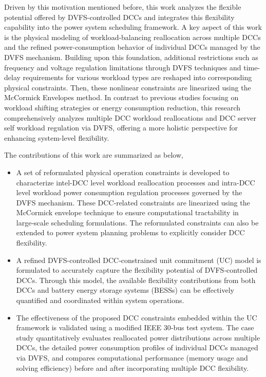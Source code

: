 \documentclass[lettersize,journal]{IEEEtran}
\begin{document}
Driven by this motivation mentioned before, this work analyzes the flexible potential offered by DVFS-controlled DCCs and integrates this flexibility capability into the power system scheduling framework. A key aspect of this work is the physical modeling of workload-balancing reallocation across multiple DCCs and the refined power-consumption behavior of individual DCCs managed by the DVFS mechanism. Building upon this foundation, additional restrictions such as frequency and voltage regulation limitations through DVFS techniques and time-delay requirements for various workload types are reshaped into corresponding physical constraints. Then, these nonlinear constraints are linearized using the McCormick Envelopes method. In contrast to previous studies focusing on workload shifting strategies or energy consumption reduction, this research comprehensively analyzes multiple DCC workload reallocations and DCC server self workload regulation via DVFS, offering a more holistic perspective for enhancing system-level flexibility.


The contributions of this work are summarized as below,
	\begin{itemize}
		\item[-] A set of reformulated physical operation constraints is developed to characterize intel-DCC level workload reallocation processes and intra-DCC level workload power consumption regulation processes governed by the DVFS mechanism. These DCC‑related constraints are linearized using the McCormick envelope technique to ensure computational tractability in large‑scale scheduling formulations. The reformulated constraints can
		      also be extended to power system planning problems to explicitly consider DCC flexibility.
		\item[-] A refined DVFS-controlled DCC‑constrained unit commitment (UC) model is formulated to accurately capture the flexibility potential of DVFS‑controlled DCCs. Through this model, the available flexibility contributions from both DCCs and battery energy storage systems (BESSs) can be effectively quantified and coordinated within system operations.
		\item[-] The effectiveness of the proposed DCC constraints embedded within the UC framework is validated using a modified IEEE 30‑bus test system. The case study quantitatively evaluates reallocated power distributions across multiple DCCs, the detailed power consumption profiles of individual DCCs
		      managed via DVFS, and compares computational performance (memory usage and solving efficiency) before and after incorporating multiple DCC flexibility.
	\end{itemize}
\end{document}
